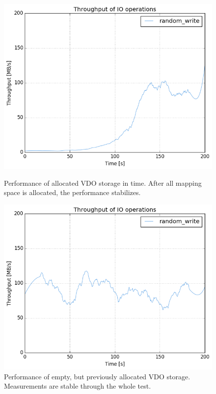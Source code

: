 \documentclass[
  color, %
  table, %
  lof,   %
  lot,   %
]{fithesis3}
\begin{document}
\clearpage
\begin{figure}[!h]
        \centering
        \includegraphics[width=\textwidth]{../results/empty_VDO/HDD/tar_467_bw}
\caption[Performance of unallocated VDO storage]{Performance of allocated VDO storage in time. After all mapping space is allocated, the performance stabilizes.}
\label{fig:emptyVDO}
        \centering
        \includegraphics[width=\textwidth]{../results/empty_VDO/HDD/tar_224_bw}
\caption[Performance of allocated VDO storage]{Performance of empty, but previously allocated VDO storage. Measurements are stable through the whole test.}
\label{fig:preallocatedVDO}
\end{figure}
\end{document}
